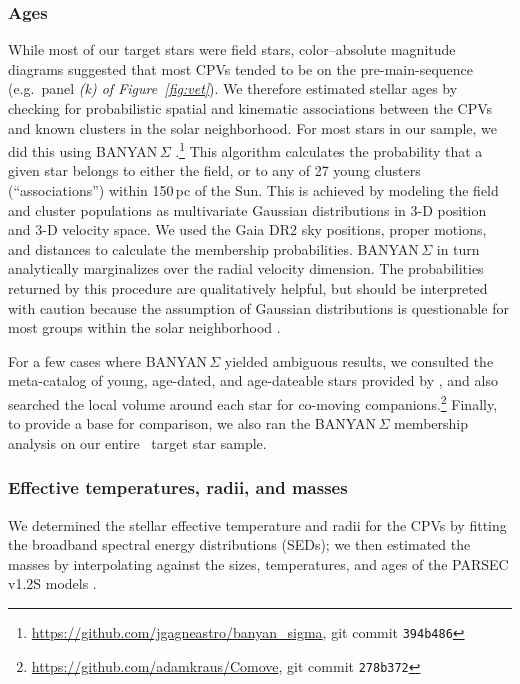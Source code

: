 \documentclass[11pt,twocolumn,tighten]{aastex63}
\begin{document}
\subsubsection{Ages}
While most of our target stars were field stars, color--absolute
magnitude diagrams suggested that most CPVs tended to be on the
pre-main-sequence (e.g.\ panel {\it (k) of Figure~\ref{fig:vet}}).  We
therefore estimated stellar ages by checking for probabilistic spatial
and kinematic associations between the CPVs and known clusters in the
solar neighborhood.  For most stars in our sample, we did this using
BANYAN\,$\Sigma$
\citep{2018ApJ...856...23G}.\footnote{\url{https://github.com/jgagneastro/banyan_sigma},
git commit \texttt{394b486}} This algorithm calculates the probability
that a given star belongs to either the field, or to any of 27 young
clusters (``associations'') within 150\,pc of the Sun.  This is
achieved by modeling the field and cluster populations as multivariate
Gaussian distributions in 3-D position and 3-D velocity space.  We
used the Gaia DR2 sky positions, proper motions, and distances to
calculate the membership probabilities.  BANYAN\,$\Sigma$ in turn
analytically marginalizes over the radial velocity dimension.  The
probabilities returned by this procedure are qualitatively helpful,
but should be interpreted with caution because the assumption of
Gaussian distributions is questionable for most groups within the
solar neighborhood \citep[see e.g.][Figure~10]{2021ApJ...917...23K}.

For a few cases where BANYAN\,$\Sigma$ yielded ambiguous results, we
consulted the meta-catalog of young, age-dated, and age-dateable stars
provided by \citet{2022AJ....163..121B}, and also searched the local
volume around each star for co-moving
companions.\footnote{\url{https://github.com/adamkraus/Comove}, git
commit \texttt{278b372}} Finally, to provide a base for comparison, we
also ran the BANYAN\,$\Sigma$ membership analysis on our entire
\nstarssearched\ target star sample.

\subsubsection{Effective temperatures, radii, and masses}

We determined the stellar effective temperature and radii for the CPVs
by fitting the broadband spectral energy distributions (SEDs); we then
estimated the masses by interpolating against the sizes, temperatures,
and ages of the PARSEC v1.2S models
\citep{2012MNRAS.427..127B,2014MNRAS.444.2525C}.
\end{document}
